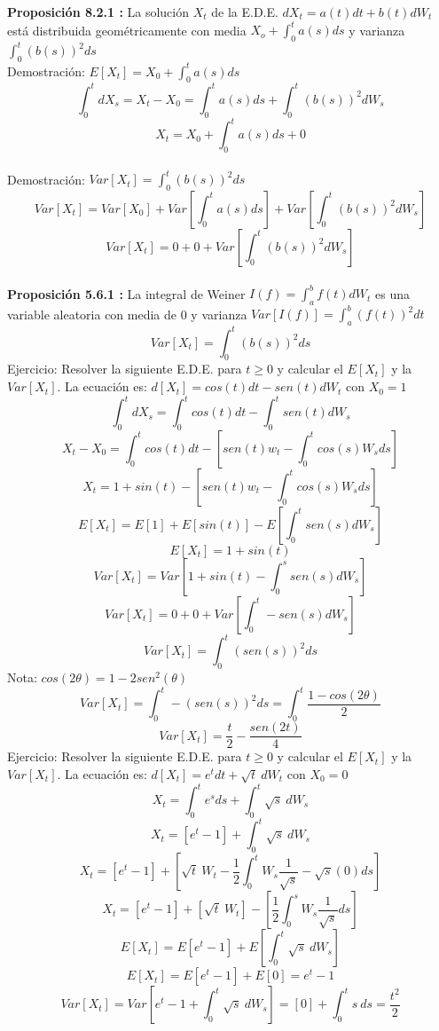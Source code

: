 \documentclass[11pt,fleqn]{book} %
\numberwithin{equation}{section} %
\numberwithin{figure}{section} %
\numberwithin{table}{section} %
\begin{document}
\textbf{Proposición 8.2.1 :} La solución $X_{t}$ de la E.D.E. $d X_{t} = a(t) dt + b(t) dW_{t}$ está distribuida geométricamente con media $X_{o} + \int^{t}_{0} a(s) ds$ y varianza $\int^{t}_{0} (b(s))^2 ds$
\ \\%
Demostración: $ E[X_{t}] = X_{0} + \int_{0}^{t} a(s) ds $
$$ \int_{0}^{t} d X_{s} = X_{t} - X_{0} = \int_{0}^{t} a(s) ds + \int_{0}^{t} (b(s))^2 dW_{s}  $$
$$ X_{t} = X_{0} + \int_{0}^{t}  a(s) ds + 0$$
\ \\%
Demostración: $ Var[X_{t}] = \int^{t}_{0} (b(s))^2 ds $
$$ Var[X_{t}] = Var[X_{0}] + Var[\int_{0}^{t} a(s) ds] + Var[\int_{0}^{t} (b(s))^2 dW_{s}]   $$
$$ Var[X_{t}] =0 + 0 + Var[\int_{0}^{t} (b(s))^2 dW_{s}]   $$
\ \\%
\textbf{Proposición 5.6.1 :} La integral de Weiner $I(f) = \int_{a}^{b} f(t) dW_{t}$ es una variable aleatoria con media de 0 y varianza $Var[I(f)] = \int_{a}^{b} (f(t))^2 dt$
$$Var[X_{t}] = \int_{0}^{t} (b(s))^2 ds $$
Ejercicio: Resolver la siguiente E.D.E. para $ t \geq 0 $ y calcular el $E[X_{t}]$  y la $Var[X_{t}]$. La ecuación es: $d[X_{t}] = cos(t) dt - sen(t) dW_{t}$ con $X_{0} = 1$
$$ \int_{0}^{t} dX_{s} = \int_{0}^{t} cos(t) dt - \int_{0}^{t} sen(t) dW_{s}$$
$$ X_{t} - X_{0} = \int_{0}^{t} cos(t) dt - [sen(t) w_{t} - \int_{0}^{t} cos(s) W_{s} ds ]$$
$$ X_{t} = 1 + sin(t) - [sen(t) w_{t} - \int_{0}^{t} cos(s) W_{s} ds ] $$
$$ E[X_{t}] = E[1] + E[sin(t)] - E[\int_{0}^{t} sen(s) dW_{s}]$$
$$ E[X_{t}] = 1 + sin(t) $$
$$ Var[X_{t}] =  Var[1 + sin(t) - \int_{0}^{s} sen(s) dW_{s}] $$
$$ Var[X_{t}] =  0 + 0 +  Var[ \int_{0}^{t} - sen(s) dW_{s}] $$
$$ Var[X_{t}] = \int_{0}^{t} (sen(s))^2 ds $$
Nota: $cos(2\theta) = 1- 2sen^2(\theta)$
$$ Var[X_{t}] = \int_{0}^{t} - (sen(s))^2 ds = \int_{0}^{t} \frac{1 - cos(2\theta)}{2} $$
$$ Var[X_{t}] = \frac{t}{2} - \frac{sen(2t)}{4} $$
Ejercicio: Resolver la siguiente E.D.E. para $ t \geq 0 $ y calcular el $E[X_{t}]$  y la $Var[X_{t}]$. La ecuación es: $d[X_{t}] = e^{t} dt + \sqrt{t}\:  dW_{t}$ con $X_{0} = 0$
$$ X_{t} = \int_{0}^{t} e^{s} ds + \int_{0}^{t} \sqrt{s}\:  dW_{s} $$
$$ X_{t} = [e^{t} - 1] + \int_{0}^{t} \sqrt{s}\:  dW_{s} $$
$$ X_{t} = [e^{t} - 1] + [\sqrt{t}\:W_{t} - \frac{1}{2} \int_{0}^{t} W_{s} \frac{1}{\sqrt{s}} - \sqrt{s}(0) ds]$$
$$ X_{t} = [e^{t} - 1] + [\sqrt{t}\:W_{t}] - [\frac{1}{2} \int_{0}^{s} W_{s} \frac{1}{\sqrt{s}} ds]$$
$$ E[X_{t}] = E[e^{t} - 1] + E[\int_{0}^{t} \sqrt{s}\:  dW_{s}]$$
$$ E[X_{t}] = E[e^{t} - 1] + E[0] = e^{t} - 1$$
$$ Var[X_{t}] = Var[e^{t} - 1 + \int_{0}^{t} \sqrt{s}\:  dW_{s}] = [0] + \int_{0}^{t} s \: ds  = \frac{t^2}{2}$$
\end{document}
